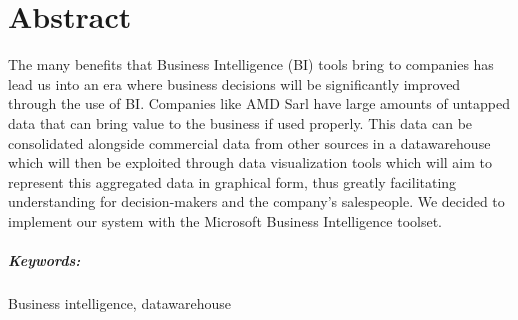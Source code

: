 \chapter*{Abstract}%
%
The many benefits that Business Intelligence (BI) tools bring to companies has lead us into an era where business decisions will be significantly improved through the use of BI. Companies like AMD Sarl have large amounts of untapped data that can bring value to the business if used properly. This data can be consolidated alongside commercial data from other sources in a datawarehouse which will then be exploited through data visualization tools which will aim to represent this aggregated data in graphical form, thus greatly facilitating understanding for decision-makers and the company's salespeople. We decided to implement our system with the Microsoft Business Intelligence toolset.

\paragraph{Keywords:} Business intelligence, datawarehouse